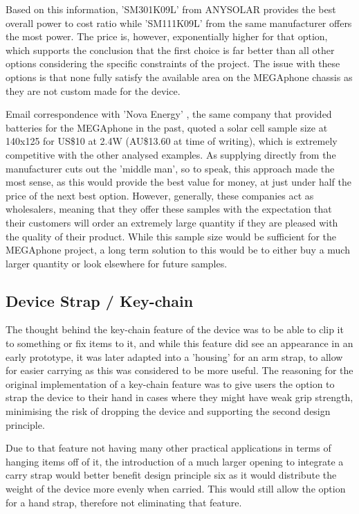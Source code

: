 Based on this information, 'SM301K09L' from ANYSOLAR provides the best overall power to cost ratio while 'SM111K09L' from the same manufacturer offers the most power.
The price is, however, exponentially higher for that option, which supports the conclusion that the first choice is far better than all other options considering the specific constraints of the project.
The issue with these options is that none fully satisfy the available area on the MEGAphone chassis as they are not custom made for the device.

Email correspondence with 'Nova Energy' \cite{nova}, the same company that provided batteries for the MEGAphone in the past, quoted a solar cell sample size at 140x125 for US\$10 at 2.4W (AU\$13.60 at time of writing), which is extremely competitive with the other analysed examples.
As supplying directly from the manufacturer cuts out the 'middle man', so to speak, this approach made the most sense, as this would provide the best value for money, at just under half the price of the next best option.
However, generally, these companies act as wholesalers, meaning that they offer these samples with the expectation that their customers will order an extremely large quantity if they are pleased with the quality of their product.
While this sample size would be sufficient for the MEGAphone project, a long term solution to this would be to either buy a much larger quantity or look elsewhere for future samples.

\subsection{Device Strap / Key-chain}

The thought behind the key-chain feature of the device was to be able to clip it to something or fix items to it, and while this feature did see an appearance in an early prototype, it was later adapted into a 'housing' for an arm strap, to allow for easier carrying as this was considered to be more useful.
The reasoning for the original implementation of a key-chain feature was to give users the option to strap the device to their hand in cases where they might have weak grip strength, minimising the risk of dropping the device and supporting the second design principle.

Due to that feature not having many other practical applications in terms of hanging items off of it, the introduction of a much larger opening to integrate a carry strap would better benefit design principle six as it would distribute the weight of the device more evenly when carried.
This would still allow the option for a hand strap, therefore not eliminating that feature.
 
